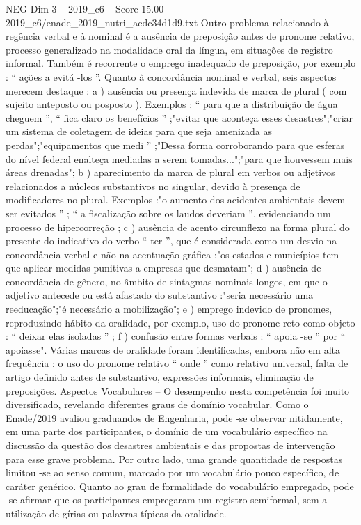 \begin{textsample}{NEG Dim 3 – 2019\_c6 – Score 15.00 – 2019\_c6/enade\_2019\_nutri\_acdc34d1d9.txt}
Outro problema relacionado à regência verbal e à nominal é a ausência de preposição antes de pronome relativo, processo generalizado na modalidade oral da língua, em situações de registro informal.
Também é recorrente o emprego inadequado de preposição, por exemplo : “ ações a evitá -los ”.
Quanto à concordância nominal e verbal, seis aspectos merecem destaque : a ) ausência ou presença indevida de marca de plural ( com sujeito anteposto ou posposto ).
Exemplos : “ para que a distribuição de água cheguem ”, “ fica claro os benefícios ” ;"evitar que aconteça esses desastres";"criar um sistema de coletagem de ideias para que seja amenizada as perdas";"equipamentos que medi ” ;"Dessa forma corroborando para que esferas do nível federal enalteça mediadas a serem tomadas...";"para que houvessem mais áreas drenadas"; b ) aparecimento da marca de plural em verbos ou adjetivos relacionados a núcleos substantivos no singular, devido à presença de modificadores no plural.
Exemplos :"o aumento dos acidentes ambientais devem ser evitados ” ; “ a fiscalização sobre os laudos deveriam ”, evidenciando um processo de hipercorreção ; c ) ausência de acento circunflexo na forma plural do presente do indicativo do verbo “ ter ”, que é considerada como um desvio na concordância verbal e não na acentuação gráfica :"os estados e municípios tem que aplicar medidas punitivas a empresas que desmatam"; d ) ausência de concordância de gênero, no âmbito de sintagmas nominais longos, em que o adjetivo antecede ou está afastado do substantivo :"seria necessário uma reeducação";"é necessário a mobilização"; e ) emprego indevido de pronomes, reproduzindo hábito da oralidade, por exemplo, uso do pronome reto como objeto : “ deixar elas isoladas ” ; f ) confusão entre formas verbais : “ apoia -se ” por “ apoiasse".
Várias marcas de oralidade foram identificadas, embora não em alta frequência : o uso do pronome relativo “ onde ” como relativo universal, falta de artigo definido antes de substantivo, expressões informais, eliminação de preposições.
Aspectos Vocabulares – O desempenho nesta competência foi muito diversificado, revelando diferentes graus de domínio vocabular.
Como o Enade/2019 avaliou graduandos de Engenharia, pode -se observar nitidamente, em uma parte dos participantes, o domínio de um vocabulário específico na discussão da questão dos desastres ambientais e das propostas de intervenção para esse grave problema.
Por outro lado, uma grande quantidade de respostas limitou -se ao senso comum, marcado por um vocabulário pouco específico, de caráter genérico.
Quanto ao grau de formalidade do vocabulário empregado, pode -se afirmar que os participantes empregaram um registro semiformal, sem a utilização de gírias ou palavras típicas da oralidade.

\end{textsample}
